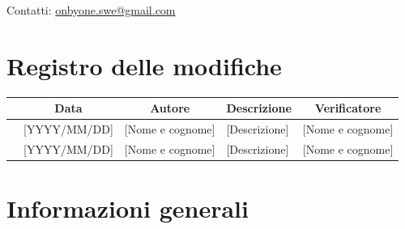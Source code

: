 \documentclass[11pt, a4paper]{article}
\begin{document}
\begin{titlepage}
    \vspace{0.5cm}
    
    {\large Contatti: \href{mailto:onbyone.swe@gmail.com}{onbyone.swe@gmail.com} }
    
\end{titlepage}

\newpage

\section*{Registro delle modifiche}

\vspace{1cm}
\begin{center}
    \renewcommand{\arraystretch}{1.5}
    \begin{tabularx}{\textwidth}{|c|c|c|X|c|}
        \hline
        \rowcolor{gray!10} 
        \multicolumn{1}{|c|}{\textbf{Versione}} & 
        \multicolumn{1}{c|}{\textbf{Data}} & 
        \multicolumn{1}{c|}{\textbf{Autore}} & 
        \multicolumn{1}{c|}{\textbf{Descrizione}} & 
        \multicolumn{1}{c|}{\textbf{Verificatore}} \\
        \hline
        [1.X.X] & [YYYY/MM/DD] & [Nome e cognome] & [Descrizione] & [Nome e cognome] \\
        \hline
        [0.1.0] & [YYYY/MM/DD] & [Nome e cognome] & [Descrizione] & [Nome e cognome] \\
        \hline
    \end{tabularx}
\end{center}
\vfill
\newpage

\tableofcontents
\newpage

\section{Informazioni generali}
\end{document}
